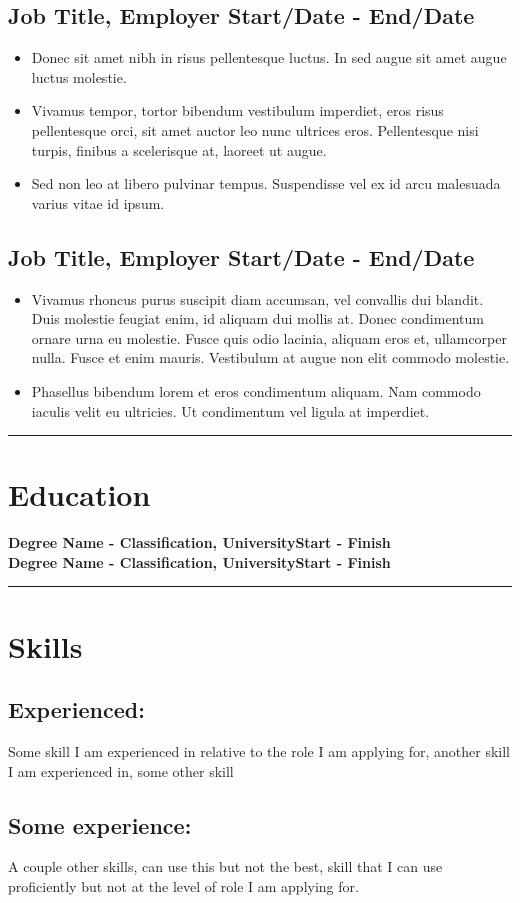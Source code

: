 \documentclass[a4paper]{article}
\newcommand{\divider}{{\noindent\color{light-gray}\rule{\textwidth}{0.4pt}}}
\begin{document}
		\subsection*{Job Title, Employer \hfill Start/Date - End/Date}
			\begin{itemize}
				\item Donec sit amet nibh in risus pellentesque luctus. In sed augue sit amet augue luctus molestie.
				\item Vivamus tempor, tortor bibendum vestibulum imperdiet, eros risus pellentesque orci, sit amet auctor leo nunc ultrices eros. Pellentesque nisi turpis, finibus a scelerisque at, laoreet ut augue.
				\item Sed non leo at libero pulvinar tempus. Suspendisse vel ex id arcu malesuada varius vitae id ipsum.
			\end{itemize}
		\subsection*{Job Title, Employer \hfill Start/Date - End/Date}
			\begin{itemize}
				\item Vivamus rhoncus purus suscipit diam accumsan, vel convallis dui blandit. Duis molestie feugiat enim, id aliquam dui mollis at. Donec condimentum ornare urna eu molestie. Fusce quis odio lacinia, aliquam eros et, ullamcorper nulla. 							Fusce et enim mauris. Vestibulum at augue non elit commodo molestie.
				
				\item Phasellus bibendum lorem et eros condimentum aliquam. Nam commodo iaculis velit eu ultricies. Ut condimentum vel ligula at imperdiet. 
			\end{itemize}
		
	\divider
	
	\section*{Education}
		\textbf{Degree Name - Classification, University\hfill Start - Finish}\\
		\textbf{Degree Name - Classification, University\hfill Start - Finish}\\

	\divider
	
	\section*{Skills}
		\subsection*{Experienced: }
			Some skill I am experienced in relative to the role I am applying for, another skill I am experienced in, some other skill
		\subsection*{Some experience: } 
			A couple other skills, can use this but not the best, skill that I can use proficiently but not at the level of role I am applying for.
	
\end{document}
